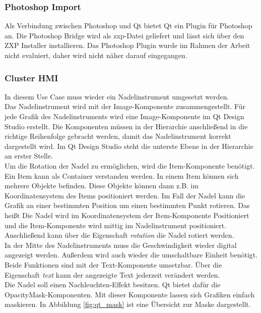 \subsubsection{Photoshop Import}

Als Verbindung zwischen Photoshop und Qt bietet Qt ein Plugin für Photoshop an. Die Photoshop Bridge wird als zxp-Datei geliefert und lässt sich über den ZXP Installer installieren. Das Photoshop Plugin wurde im Rahmen der Arbeit nicht evaluiert, daher wird nicht näher darauf eingegangen.\\


\subsubsection{Cluster HMI}
In diesem Use Case muss wieder ein Nadelinstrument umgesetzt werden.\\

Das Nadelinstrument wird mit der Image-Komponente zusammengestellt. Für jede Grafik des Nadelinstruments wird eine Image-Komponente im Qt Design Studio erstellt. Die Komponenten müssen in der Hierarchie anschließend in die richtige Reihenfolge gebracht werden, damit das Nadelinstrument korrekt dargestellt wird. Im Qt Design Studio steht die unterste Ebene in der Hierarchie an erster Stelle.\\

Um die Rotation der Nadel zu ermöglichen, wird die Item-Komponente benötigt. Ein Item kann als Container verstanden werden. In einem Item können sich mehrere Objekte befinden. Diese Objekte können dann z.B. im Koordinatensystem des Items positioniert werden. Im Fall der Nadel kann die Grafik an einer bestimmten Position um einen bestimmten Punkt rotieren. Das heißt Die Nadel wird im Koordinatensystem der Item-Komponente Positioniert und die Item-Komponente wird mittig im Nadelinstrument positioniert. Anschließend kann über die Eigenschaft \textit{rotation} die Nadel rotiert werden.\\


In der Mitte des Nadelinstruments muss die Geschwindigkeit wieder digital angezeigt werden. Außerdem wird auch wieder die umschaltbare Einheit benötigt. Beide Funktionen sind mit der Text-Komponente umsetzbar. Über die Eigenschaft \textit{text} kann der angezeigte Text jederzeit verändert werden.\\


Die Nadel soll einen Nachleuchten-Effekt besitzen. Qt bietet dafür die OpacityMask-Komponenten. Mit dieser Komponente lassen sich Grafiken einfach maskieren. In Abbildung \ref{fig:qt_mask} ist eine Übersicht zur Maske dargestellt.\\

